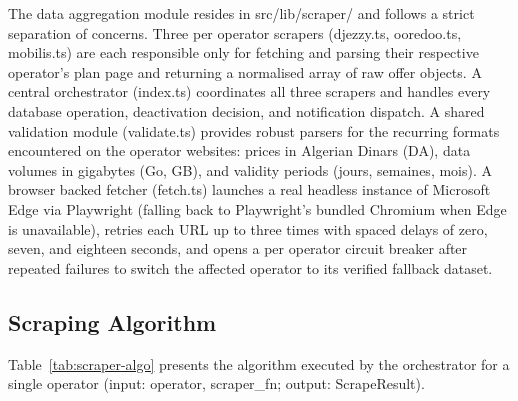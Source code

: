The data aggregation module resides in src/lib/scraper/ and follows a strict separation of concerns. Three per operator scrapers (djezzy.ts, ooredoo.ts, mobilis.ts) are each responsible only for fetching and parsing their respective operator's plan page and returning a normalised array of raw offer objects. A central orchestrator (index.ts) coordinates all three scrapers and handles every database operation, deactivation decision, and notification dispatch. A shared validation module (validate.ts) provides robust parsers for the recurring formats encountered on the operator websites: prices in Algerian Dinars (\guillemotleft{}DA\guillemotright{}), data volumes in gigabytes (\guillemotleft{}Go\guillemotright{}, \guillemotleft{}GB\guillemotright{}), and validity periods (\guillemotleft{}jours\guillemotright{}, \guillemotleft{}semaines\guillemotright{}, \guillemotleft{}mois\guillemotright{}). A browser backed fetcher (fetch.ts) launches a real headless instance of Microsoft Edge via Playwright (falling back to Playwright's bundled Chromium when Edge is unavailable), retries each URL up to three times with spaced delays of zero, seven, and eighteen seconds, and opens a per operator circuit breaker after repeated failures to switch the affected operator to its verified fallback dataset.

\subsection{Scraping Algorithm}

Table~\ref{tab:scraper-algo} presents the algorithm executed by the orchestrator for a single operator (input: operator, scraper\_fn; output: ScrapeResult).

